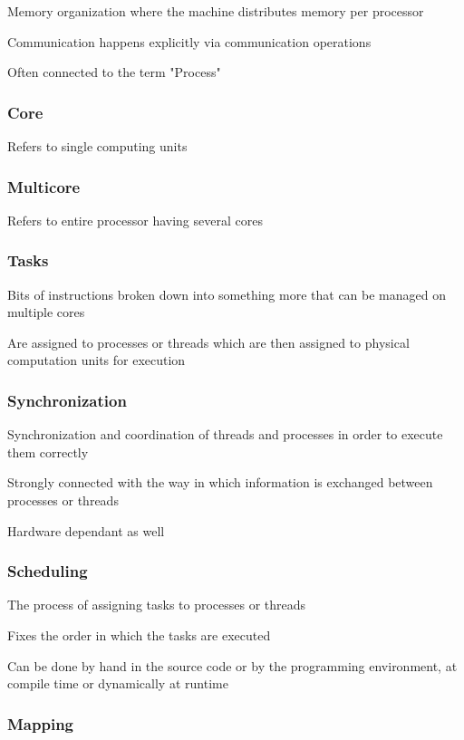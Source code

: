 \documentclass{article}
\begin{document}
Memory organization where the machine distributes memory per processor

Communication happens explicitly via communication operations

Often connected to the term "Process"

\subsubsection{Core}

Refers to single computing units

\subsubsection{Multicore}

Refers to entire processor having several cores

\subsubsection{Tasks}

Bits of instructions broken down into something more that can be managed on multiple cores

Are assigned to processes or threads which are then assigned to physical computation units for execution

\subsubsection{Synchronization}

Synchronization and coordination of threads and processes in order to execute them correctly

Strongly connected with the way in which information is exchanged between processes or threads

Hardware dependant as well

\subsubsection{Scheduling}

The process of assigning tasks to processes or threads

Fixes the order in which the tasks are executed

Can be done by hand in the source code or by the programming environment, at compile time or dynamically at runtime

\subsubsection{Mapping}
\end{document}
